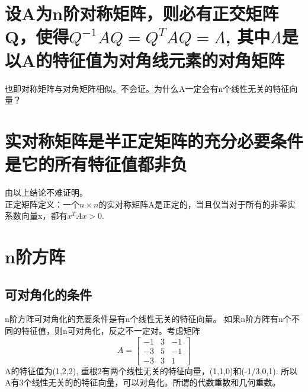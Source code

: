 \documentclass[]{article}
\begin{document}
\section{设A为n阶对称矩阵，则必有正交矩阵Q，使得$ Q^{-1}AQ = Q^TAQ = \Lambda $, 其中$ \Lambda $是以A的特征值为对角线元素的对角矩阵}
也即对称矩阵与对角矩阵相似。不会证。为什么A一定会有n个线性无关的特征向量？

\section{实对称矩阵是半正定矩阵的充分必要条件是它的所有特征值都非负}
由以上结论不难证明。\\
正定矩阵定义：一个$ n \times n $的实对称矩阵A是正定的，当且仅当对于所有的非零实系数向量x，都有$ x^T A x > 0 $.

\section{n阶方阵}
\subsection{可对角化的条件}
n阶方阵可对角化的充要条件是有n个线性无关的特征向量。
如果n阶方阵有n个不同的特征值，则n可对角化，反之不一定对。考虑矩阵
\begin{equation}
A = 
\begin{bmatrix}
-1 & 3 & -1 \\
-3 & 5 & -1 \\
-3 & 3 & 1
\end{bmatrix}
\end{equation}
A的特征值为(1,2,2), 重根2有两个线性无关的特征向量，(1,1,0)和(-1/3,0,1). 所以A有3个线性无关的的特征向量，可以对角化。所谓的代数重数和几何重数。
\end{document}
